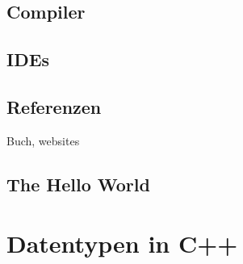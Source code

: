 \documentclass[a4paper]{report}
\theoremstyle{nonumberplain}
\begin{document}
\section{Compiler}
\section{IDEs}
\section{Referenzen}
Buch, websites
\section{The Hello World}

\chapter{Datentypen in C++}
\end{document}
